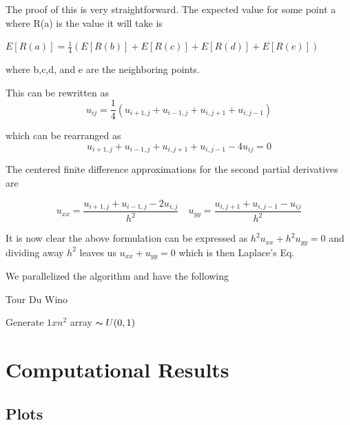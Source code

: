 \documentclass{amsart}
\begin{document}
The proof of this is very straightforward. The expected value for some point a where R(a) is the value it will take is

$ E[R(a)] = \frac{1}{4} (E[R(b)] + E[R(c)] + E[R(d)] + E[R(e)]  )$

where b,c,d, and e are the neighboring points.

This can be rewritten as
\begin{equation}
u_{ij} = \frac{1}{4} (u_{i+1,j} + u_{i-1,j} + u_{i,j+1} + u_{i,j-1})
\end{equation}

which can be rearranged as
\begin{equation*}
u_{i+1,j} + u_{i-1,j} + u_{i,j+1} + u_{i,j-1} - 4u_{ij} = 0
\end{equation*}

The centered finite difference approximations for the second partial derivatives are

\begin{equation*} 
	u_{xx} = \frac{u_{i+1,j} + u_{i-1,j} - 2u_{i,j}}{h^2} \quad u_{yy} = \frac{u_{i,j+1} + u_{i,j-1} - u_{ij}}{h^2}
\end{equation*}

It is now clear the above formulation can be expressed as $h^2 u_{xx} + h^2 u_{yy} = 0$ and dividing away $h^2$ leaves us $u_{xx} + u_{yy} = 0$ which is then Laplace's Eq.

We parallelized the algorithm and have the following
\begin{algorithm}
	\begin{algorithmic}[1]
		\caption{Tour Du Wino}
		\State Generate $1xn^2$ array $\thicksim U(0,1)$
	\end{algorithmic}
\end{algorithm}

\section{Computational Results}

\subsection{Plots}
\end{document}
